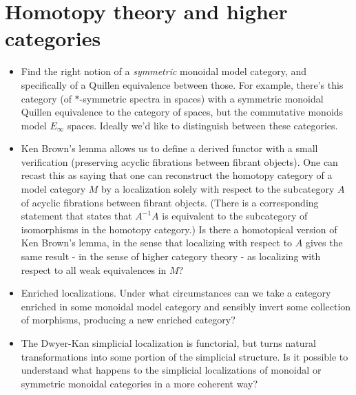 \documentclass[12pt,titlepage]{article}
\theoremstyle{plain}
\theoremstyle{definition}
\theoremstyle{remark}
\begin{document}
\section{Homotopy theory and higher categories}

\begin{itemize}%
\item Find the right notion of a \emph{symmetric} monoidal model category, and specifically of a Quillen equivalence between those. For example, there'{}s this category (of $\ast$-symmetric spectra in spaces) with a symmetric monoidal Quillen equivalence to the category of spaces, but the commutative monoids model $E_\infty$ spaces. Ideally we'{}d like to distinguish between these categories.
\item Ken Brown'{}s lemma allows us to define a derived functor with a small verification (preserving acyclic fibrations between fibrant objects). One can recast this as saying that one can reconstruct the homotopy category of a model category $M$ by a localization solely with respect to the subcategory $A$ of acyclic fibrations between fibrant objects. (There is a corresponding statement that states that $A^{-1} A$ is equivalent to the subcategory of isomorphisms in the homotopy category.) Is there a homotopical version of Ken Brown'{}s lemma, in the sense that localizing with respect to $A$ gives the same result - in the sense of higher category theory - as localizing with respect to all weak equivalences in $M$?
\item Enriched localizations. Under what circumstances can we take a category enriched in some monoidal model category and sensibly invert some collection of morphisms, producing a new enriched category?
\item The Dwyer-Kan simplicial localization is functorial, but turns natural transformations into some portion of the simplicial structure. Is it possible to understand what happens to the simplicial localizations of monoidal or symmetric monoidal categories in a more coherent way?

\end{itemize}
\end{document}
